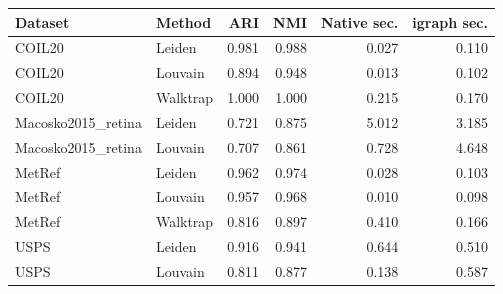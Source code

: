 \begin{tabular}{llrrrr}
\toprule
Dataset & Method & ARI & NMI & Native sec. & igraph sec. \\
\midrule
COIL20 & Leiden & 0.981 & 0.988 & 0.027 & 0.110 \\
COIL20 & Louvain & 0.894 & 0.948 & 0.013 & 0.102 \\
COIL20 & Walktrap & 1.000 & 1.000 & 0.215 & 0.170 \\
Macosko2015\_retina & Leiden & 0.721 & 0.875 & 5.012 & 3.185 \\
Macosko2015\_retina & Louvain & 0.707 & 0.861 & 0.728 & 4.648 \\
MetRef & Leiden & 0.962 & 0.974 & 0.028 & 0.103 \\
MetRef & Louvain & 0.957 & 0.968 & 0.010 & 0.098 \\
MetRef & Walktrap & 0.816 & 0.897 & 0.410 & 0.166 \\
USPS & Leiden & 0.916 & 0.941 & 0.644 & 0.510 \\
USPS & Louvain & 0.811 & 0.877 & 0.138 & 0.587 \\
\bottomrule
\end{tabular}
